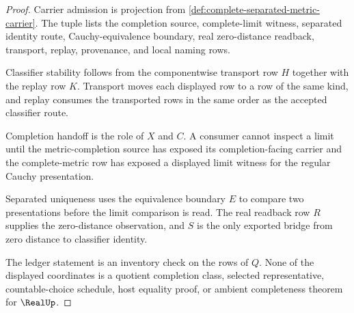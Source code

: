 \begin{proof}
Carrier admission is projection from \autoref{def:complete-separated-metric-carrier}. The tuple lists the completion source, complete-limit witness, separated identity route, Cauchy-equivalence boundary, real zero-distance readback, transport, replay, provenance, and local naming rows.

Classifier stability follows from the componentwise transport row $H$ together with the replay row $K$. Transport moves each displayed row to a row of the same kind, and replay consumes the transported rows in the same order as the accepted classifier route.

Completion handoff is the role of $X$ and $C$. A consumer cannot inspect a limit until the metric-completion source has exposed its completion-facing carrier and the complete-metric row has exposed a displayed limit witness for the regular Cauchy presentation.

Separated uniqueness uses the equivalence boundary $E$ to compare two presentations before the limit comparison is read. The real readback row $R$ supplies the zero-distance observation, and $S$ is the only exported bridge from zero distance to classifier identity.

The ledger statement is an inventory check on the rows of $Q$. None of the displayed coordinates is a quotient completion class, selected representative, countable-choice schedule, host equality proof, or ambient completeness theorem for $\RealUp$.
\end{proof}

